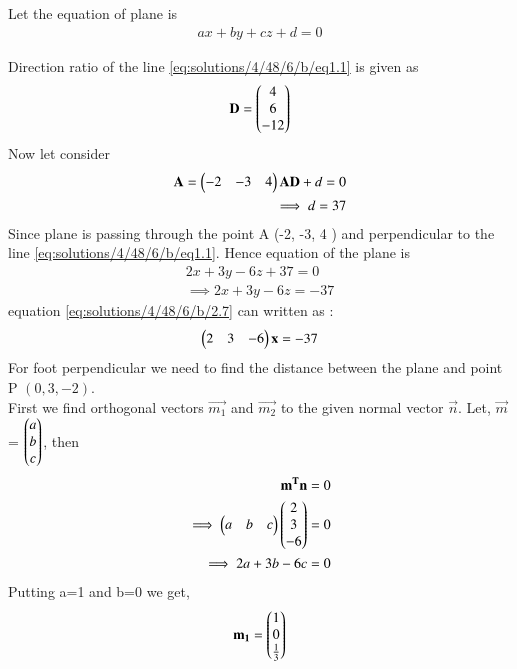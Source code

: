  Let the equation of plane is 
 \begin{align}
 ax +by +cz +d = 0 \label{eq:solutions/4/48/6/b/eq2.1}
 \end{align}
 
Direction ratio of the line \eqref{eq:solutions/4/48/6/b/eq1.1} is given as 
\begin{align}
\mathbf{D} = \begin{pmatrix}4\\ 6 \\ -12\end{pmatrix}
\end{align}
 Now let consider 
\begin{align}
\mathbf{A} = \begin{pmatrix}-2 & -3 & 4\end{pmatrix} 
\mathbf{A}\mathbf{D} + d = 0 \\
\implies d = 37
\end{align}
Since plane is passing through the point A (-2, -3, 4 ) and perpendicular to the line 
\eqref{eq:solutions/4/48/6/b/eq1.1}.
Hence equation of the plane is 
\begin{align}
2x + 3y - 6z + 37 = 0 \\
\implies 2x + 3y - 6z = -37 \label{eq:solutions/4/48/6/b/2.7}
\end{align} 
equation \eqref{eq:solutions/4/48/6/b/2.7} can written as :
\begin{align}
\begin{pmatrix}2 & 3 & -6\end{pmatrix}\mathbf{x} = -37\\
\end{align}
For foot perpendicular we need to find the distance between the plane and point P $\left( 0, 3, -2\right)$.\\ 
First we find orthogonal vectors $\vec{m_1}$ and $\vec{m_2}$ to the given normal vector $\vec{n}$. Let, $\vec{m}$ = $\begin{pmatrix}a\\b\\c\end{pmatrix}$, then
\begin{align}
\mathbf{m^T}\mathbf{n} &= 0\\
\implies\begin{pmatrix}a&b&c\end{pmatrix}\begin{pmatrix}2\\3\\-6\end{pmatrix} &= 0\\
\implies 2a+3b-6c &= 0\\
\end{align}
{Putting a=1 and b=0 we get,}
\begin{align}
\mathbf{m_1} &= \begin{pmatrix}1\\0\\\frac{1}{3} \end{pmatrix}\\
\end{align}
